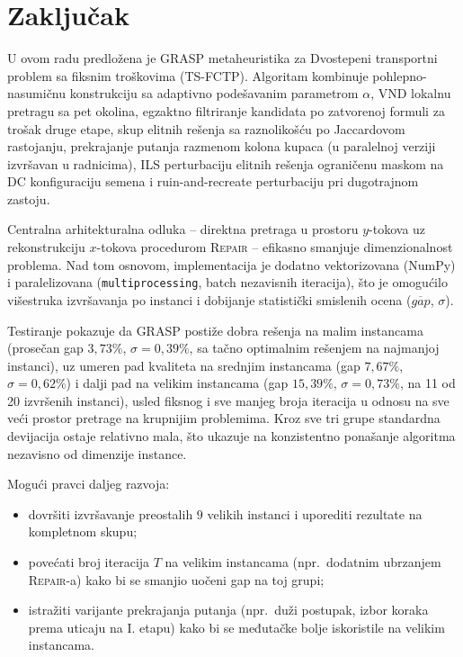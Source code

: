 \documentclass[12pt,a4paper]{article}
\begin{document}
\section{Zaključak}

U ovom radu predložena je GRASP metaheuristika za Dvostepeni transportni
problem sa fiksnim troškovima (TS-FCTP). Algoritam kombinuje pohlepno-nasumičnu
konstrukciju sa adaptivno podešavanim parametrom $\alpha$, VND lokalnu pretragu
sa pet okolina, egzaktno filtriranje kandidata po zatvorenoj formuli za trošak
druge etape, skup elitnih rešenja sa raznolikošću po Jaccardovom rastojanju,
prekrajanje putanja razmenom kolona kupaca (u paralelnoj verziji izvršavan u
radnicima), ILS perturbaciju elitnih rešenja ograničenu maskom na DC
konfiguraciju semena i ruin-and-recreate perturbaciju pri dugotrajnom zastoju.

Centralna arhitekturalna odluka -- direktna pretraga u prostoru $y$-tokova uz
rekonstrukciju $x$-tokova procedurom \textsc{Repair} -- efikasno smanjuje
dimenzionalnost problema. Nad tom osnovom, implementacija je dodatno
vektorizovana (NumPy) i paralelizovana (\texttt{multiprocessing}, batch
nezavisnih iteracija), što je omogućilo višestruka izvršavanja po instanci i
dobijanje statistički smislenih ocena ($\overline{gap}$, $\sigma$).

Testiranje pokazuje da GRASP postiže dobra rešenja na malim instancama
(prosečan gap $3{,}73\%$, $\sigma = 0{,}39\%$, sa tačno optimalnim rešenjem na
najmanjoj instanci), uz umeren pad kvaliteta na srednjim instancama (gap
$7{,}67\%$, $\sigma = 0{,}62\%$) i dalji pad na velikim instancama (gap
$15{,}39\%$, $\sigma = 0{,}73\%$, na 11 od 20 izvršenih instanci), usled
fiksnog i sve manjeg broja iteracija u odnosu na sve veći prostor pretrage na
krupnijim problemima. Kroz sve tri grupe standardna devijacija ostaje relativno
mala, što ukazuje na konzistentno ponašanje algoritma nezavisno od dimenzije
instance.

Mogući pravci daljeg razvoja:
\begin{itemize}
  \item dovršiti izvršavanje preostalih $9$ velikih instanci i uporediti
    rezultate na kompletnom skupu;
  \item povećati broj iteracija $T$ na velikim instancama (npr.\ dodatnim
    ubrzanjem \textsc{Repair}-a) kako bi se smanjio uočeni gap na toj grupi;
  \item istražiti varijante prekrajanja putanja (npr.\ duži postupak, izbor koraka
    prema uticaju na I. etapu) kako bi se međutačke bolje iskoristile na
    velikim instancama.
\end{itemize}
\end{document}
